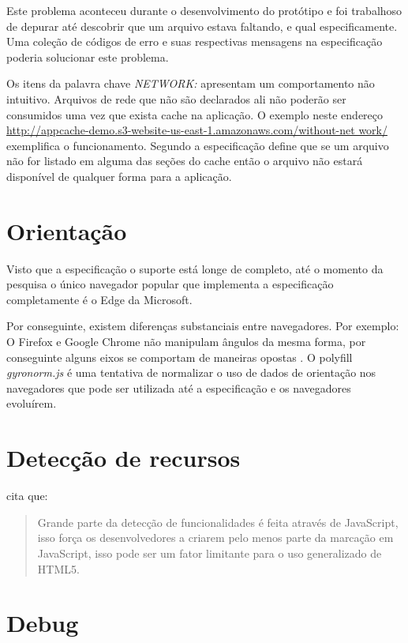 Este problema aconteceu durante o desenvolvimento do protótipo e foi
trabalhoso de depurar até descobrir que um arquivo estava faltando,
e qual especificamente. Uma coleção de códigos de erro e suas
respectivas mensagens na especificação poderia solucionar este
problema.

Os itens da palavra chave \textit{NETWORK:} apresentam um
comportamento não intuitivo. Arquivos de rede que não
são declarados ali não poderão ser consumidos uma vez
que exista cache na aplicação. O exemplo neste endereço
\url{http://appcache-demo.s3-website-us-east-1.amazonaws.com/without-net
work/} exemplifica o funcionamento. Segundo \cite{gameAssetManagement} a
especificação define que se um arquivo não for listado em alguma das
seções do cache então o arquivo não estará disponível de qualquer
forma para a aplicação.

\section{Orientação}

Visto que a especificação o suporte está longe de completo, até
o momento da pesquisa o único navegador popular que implementa a
especificação completamente é o Edge da Microsoft.

Por conseguinte, existem diferenças substanciais entre navegadores. Por
exemplo: O Firefox e Google Chrome não manipulam ângulos da mesma
forma, por conseguinte alguns eixos se comportam de maneiras opostas
\autocite{mdnOrientation}. O polyfill \textit{gyronorm.js} é uma
tentativa de normalizar o uso de dados de orientação nos navegadores
que pode ser utilizada até a especificação e os navegadores
evoluírem.

\section{Detecção de recursos}

\autocite{diveIntohtml} cita que:
\begin{quote}
Grande parte da detecção de funcionalidades é feita através de
JavaScript, isso força os desenvolvedores a criarem pelo menos parte da
marcação em JavaScript, isso pode ser um fator limitante para o uso
generalizado de HTML5.
\end{quote}

\section{Debug}

